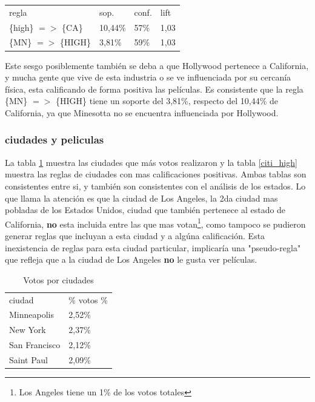 \documentclass[journal]{IEEEtran}
\begin{document}
\begin{table}[ht!]
\centering
\begin{tabular}{l l l l }
regla & sop. & conf. & lift \\
\{high\} $=$$>$ \{CA\} & 10,44\% & 57\% & 1,03 \\
\{MN\} $=$$>$ \{HIGH\} & 3,81\% & 59\% & 1,03 
\end{tabular}
\end{table}

Este sesgo posiblemente también se deba a que Hollywood pertenece a California,
y mucha gente que vive de esta industria o se ve influenciada por su cercanía
física, 
esta calificando de forma positiva las películas. Es consistente que la regla
\{MN\} $=$$>$ \{HIGH\} tiene un soporte del 3,81\%, respecto del 10,44\% de 
California, ya que Minesotta no se encuentra influenciada por Hollywood.

\subsubsection{ciudades y peliculas}
La tabla \ref{citi_votes} muestra las ciudades que más votos realizaron y
la tabla \ref{citi_high} muestra las reglas de ciudades con mas calificaciones
positivas. Ambas tablas son consistentes entre si, y también son consistentes
con el análisis de los estados. Lo que llama la atención es que la ciudad de Los
Angeles, la 2da ciudad mas  pobladas de los Estados Unidos, 
ciudad que también pertenece al estado de California, 
\textbf{no} esta incluida entre las que mas votan\footnote{Los Angeles tiene
un 1\% de los votos totales}, como tampoco se pudieron generar reglas que 
incluyan a esta ciudad y a algúna calificación. Esta inexistencia
de reglas para esta ciudad particular, implicaría una "pseudo-regla" que
refleja que a la ciudad de Los Angeles \textbf{no} le gusta ver películas.
 
\begin{table}[ht!]
\caption{Votos por ciudades}
\label{citi_votes}
\centering
\begin{tabular}{l l }
ciudad & \% votos \% \\
Minneapolis & 2,52\% \\
New York & 2,37\% \\
San Francisco & 2,12\% \\
Saint Paul & 2,09\%  \\
\end{tabular}
\end{table}
\end{document}
